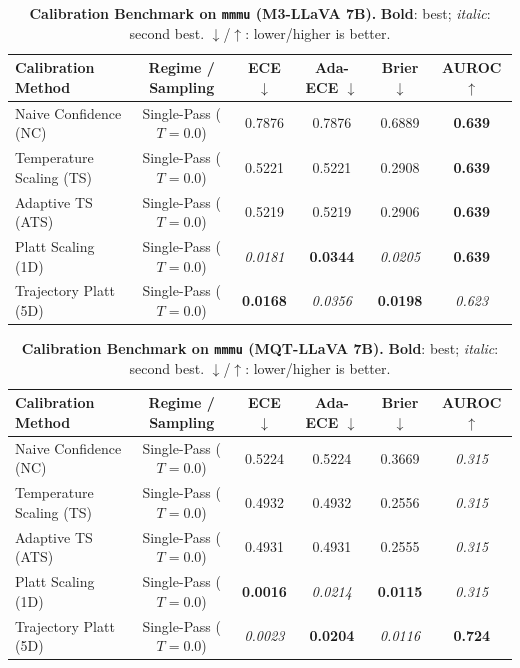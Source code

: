 \begin{table}[t]
\setlength{\tabcolsep}{4pt}
\renewcommand{\arraystretch}{1.05}
\centering
\footnotesize
\begin{tabular}{lccccc}
\toprule
\textbf{Calibration Method} & \textbf{Regime / Sampling} & \textbf{ECE} $\downarrow$ & \textbf{Ada-ECE} $\downarrow$ & \textbf{Brier} $\downarrow$ & \textbf{AUROC} $\uparrow$ \\
\midrule
Naive Confidence (NC) & Single-Pass ($T = 0.0$) & 0.7876 & 0.7876 & 0.6889 & \textbf{0.639} \\
Temperature Scaling (TS) & Single-Pass ($T = 0.0$) & 0.5221 & 0.5221 & 0.2908 & \textbf{0.639} \\
Adaptive TS (ATS) & Single-Pass ($T = 0.0$) & 0.5219 & 0.5219 & 0.2906 & \textbf{0.639} \\
Platt Scaling (1D) & Single-Pass ($T = 0.0$) & \textit{0.0181} & \textbf{0.0344} & \textit{0.0205} & \textbf{0.639} \\
Trajectory Platt (5D) & Single-Pass ($T = 0.0$) & \textbf{0.0168} & \textit{0.0356} & \textbf{0.0198} & \textit{0.623} \\
\bottomrule
\end{tabular}
\caption{\textbf{Calibration Benchmark on \texttt{mmmu} (M3-LLaVA 7B).} \textbf{Bold}: best; \textit{italic}: second best. $\downarrow$/$\uparrow$: lower/higher is better.}
\label{tab:benchmark_m3_mmmu}
\end{table}

\begin{table}[t]
\setlength{\tabcolsep}{4pt}
\renewcommand{\arraystretch}{1.05}
\centering
\footnotesize
\begin{tabular}{lccccc}
\toprule
\textbf{Calibration Method} & \textbf{Regime / Sampling} & \textbf{ECE} $\downarrow$ & \textbf{Ada-ECE} $\downarrow$ & \textbf{Brier} $\downarrow$ & \textbf{AUROC} $\uparrow$ \\
\midrule
Naive Confidence (NC) & Single-Pass ($T = 0.0$) & 0.5224 & 0.5224 & 0.3669 & \textit{0.315} \\
Temperature Scaling (TS) & Single-Pass ($T = 0.0$) & 0.4932 & 0.4932 & 0.2556 & \textit{0.315} \\
Adaptive TS (ATS) & Single-Pass ($T = 0.0$) & 0.4931 & 0.4931 & 0.2555 & \textit{0.315} \\
Platt Scaling (1D) & Single-Pass ($T = 0.0$) & \textbf{0.0016} & \textit{0.0214} & \textbf{0.0115} & \textit{0.315} \\
Trajectory Platt (5D) & Single-Pass ($T = 0.0$) & \textit{0.0023} & \textbf{0.0204} & \textit{0.0116} & \textbf{0.724} \\
\bottomrule
\end{tabular}
\caption{\textbf{Calibration Benchmark on \texttt{mmmu} (MQT-LLaVA 7B).} \textbf{Bold}: best; \textit{italic}: second best. $\downarrow$/$\uparrow$: lower/higher is better.}
\label{tab:benchmark_mqt_mmmu}
\end{table}
